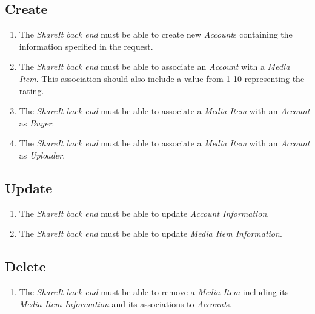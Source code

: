 \subsection{Create}
\begin{enumerate}[label=FR-\twodigits*,resume]

\item The \textit{ShareIt back end} must be able to create new \textit{Account}s containing the information specified in the request.

\item The \textit{ShareIt back end} must be able to associate an \textit{Account} with a \textit{Media Item}. This association should also include a value from 1-10 representing the rating.

\item The \textit{ShareIt back end} must be able to associate a \textit{Media Item} with an \textit{Account} as \textit{Buyer}.

\item The \textit{ShareIt back end} must be able to associate a \textit{Media Item} with an \textit{Account} as \textit{Uploader}.

\end{enumerate}
\subsection{Update}
\begin{enumerate}[label=FR-\twodigits*,resume]

\item The \textit{ShareIt back end} must be able to update \textit{Account Information}. 

\item The \textit{ShareIt back end} must be able to update \textit{Media Item Information}.

\end{enumerate}
\subsection{Delete}
\begin{enumerate}[label=FR-\twodigits*,resume]

\item The \textit{ShareIt back end} must be able to remove a \textit{Media Item} including its \textit{Media Item Information} and its associations to \textit{Account}s.

\end{enumerate}

% 